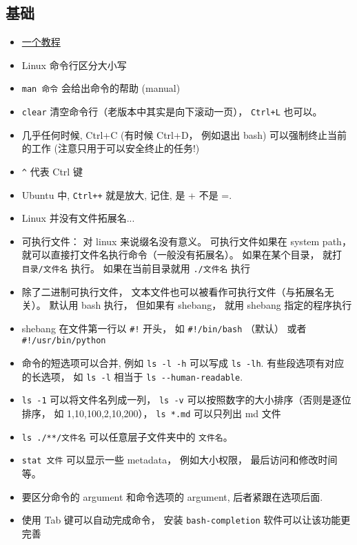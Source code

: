 

\subsection{基础}
\begin{itemize}
\item \href{http://faculty.salina.k-state.edu/tim/unix_sg/index.html}{一个教程}
\item Linux 命令行区分大小写
\item \verb`man 命令`  会给出命令的帮助 (manual)
\item \verb`clear` 清空命令行（老版本中其实是向下滚动一页）， \verb|Ctrl+L| 也可以。
\item 几乎任何时候, Ctrl+C (有时候 Ctrl+D， 例如退出 bash) 可以强制终止当前的工作 (注意只用于可以安全终止的任务!)
\item \verb`^` 代表 Ctrl 键
\item Ubuntu 中, \verb|Ctrl++| 就是放大, 记住, 是 + 不是 =.
\item Linux 并没有文件拓展名...
\item 可执行文件： 对 linux 来说缀名没有意义。 可执行文件如果在 system path， 就可以直接打文件名执行命令（一般没有拓展名）。 如果在某个目录， 就打 \verb`目录/文件名` 执行。 如果在当前目录就用 \verb`./文件名` 执行
\item 除了二进制可执行文件， 文本文件也可以被看作可执行文件（与拓展名无关）。 默认用 bash 执行， 但如果有 shebang， 就用 shebang 指定的程序执行
\item shebang 在文件第一行以 \verb`#!` 开头， 如 \verb`#!/bin/bash` （默认） 或者 \verb`#!/usr/bin/python`
\item 命令的短选项可以合并, 例如 \verb`ls -l -h` 可以写成 \verb`ls -lh`. 有些段选项有对应的长选项， 如 \verb`ls -l` 相当于 \verb`ls --human-readable`.
\item \verb`ls -1` 可以将文件名列成一列， \verb`ls -v` 可以按照数字的大小排序（否则是逐位排序， 如 1,10,100,2,10,200）， \verb`ls *.md` 可以只列出 md 文件
\item \verb|ls ./**/文件名| 可以任意层子文件夹中的 \verb|文件名|。
\item \verb|stat 文件| 可以显示一些 metadata， 例如大小权限， 最后访问和修改时间等。
\item 要区分命令的 argument 和命令选项的 argument, 后者紧跟在选项后面.
\item 使用 Tab 键可以自动完成命令， 安装 \verb|bash-completion| 软件可以让该功能更完善

\end{itemize}
